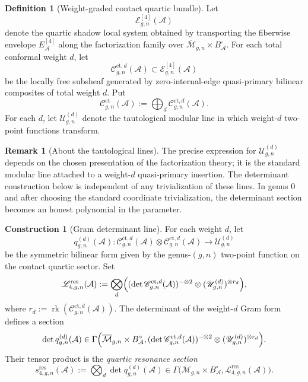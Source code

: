 \documentclass[11pt,oneside]{memoir}
\numberwithin{equation}{chapter}
\theoremstyle{definition}
\newtheorem{definition}[theorem]{Definition}
\newtheorem{construction}[theorem]{Construction}
\newtheorem{remark}[theorem]{Remark}
\newcommand{\cA}{\mathcal A}
\begin{document}
\begin{definition}[Weight-graded contact quartic bundle]
\label{def:nms-contact-quartic-bundle}
Let
\[
\mathscr E_{g,n}^{[4]}(\cA)
\]
denote the quartic shadow local system obtained by transporting the fiberwise envelope $E_{\cA}^{[4]}$ along the factorization family over $\overline{\mathcal M}_{g,n}\times B_{\cA}^{\circ}$.  For each total conformal weight $d$, let
\[
\mathscr C_{g,n}^{\mathrm{ct},d}(\cA)
\subset
\mathscr E_{g,n}^{[4]}(\cA)
\]
be the locally free subsheaf generated by zero-internal-edge quasi-primary bilinear composites of total weight $d$.  Put
\[
\mathscr C_{g,n}^{\mathrm{ct}}(\cA):=\bigoplus_d \mathscr C_{g,n}^{\mathrm{ct},d}(\cA).
\]
For each $d$, let $\mathscr U_{g,n}^{(d)}$ denote the tautological modular line in which weight-$d$ two-point functions transform.
\end{definition}

\begin{remark}[About the tautological lines]
\label{rem:nms-tautological-lines}
The precise expression for $\mathscr U_{g,n}^{(d)}$ depends on the chosen presentation of the factorization theory; it is the standard modular line attached to a weight-$d$ quasi-primary insertion.  The determinant construction below is independent of any trivialization of these lines.  In genus $0$ and after choosing the standard coordinate trivialization, the determinant section becomes an honest polynomial in the parameter.
\end{remark}

\begin{construction}[Gram determinant line]
\label{constr:nms-gram-determinant-line}
For each weight $d$, let
\[
q_{g,n}^{(d)}(\cA)
\colon
\mathscr C_{g,n}^{\mathrm{ct},d}(\cA)\otimes
\mathscr C_{g,n}^{\mathrm{ct},d}(\cA)
\longrightarrow
\mathscr U_{g,n}^{(d)}
\]
be the symmetric bilinear form given by the genus-$(g,n)$ two-point function on the contact quartic sector.  Set
\begin{equation}
\label{eq:nms-resonance-line}
\mathscr L_{4,g,n}^{\mathrm{res}}(\cA)
:=
\bigotimes_d
\Bigl(
(\det \mathscr C_{g,n}^{\mathrm{ct},d}(\cA))^{-\otimes 2}
\otimes
(\mathscr U_{g,n}^{(d)})^{\otimes r_d}
\Bigr),
\end{equation}
where $r_d:=\operatorname{rk}(\mathscr C_{g,n}^{\mathrm{ct},d}(\cA))$.  The determinant of the weight-$d$ Gram form defines a section
\[
\det q_{g,n}^{(d)}(\cA)
\in
\Gamma\Bigl(\overline{\mathcal M}_{g,n}\times B_{\cA}^{\circ},
(\det \mathscr C_{g,n}^{\mathrm{ct},d}(\cA))^{-\otimes 2}
\otimes
(\mathscr U_{g,n}^{(d)})^{\otimes r_d}
\Bigr).
\]
Their tensor product is the \emph{quartic resonance section}
\begin{equation}
\label{eq:nms-resonance-section}
s_{4,g,n}^{\mathrm{res}}(\cA)
:=
\bigotimes_d \det q_{g,n}^{(d)}(\cA)
\in \Gamma\bigl(\overline{\mathcal M}_{g,n}\times B_{\cA}^{\circ},
\mathscr L_{4,g,n}^{\mathrm{res}}(\cA)\bigr).
\end{equation}
\end{construction}
\end{document}
